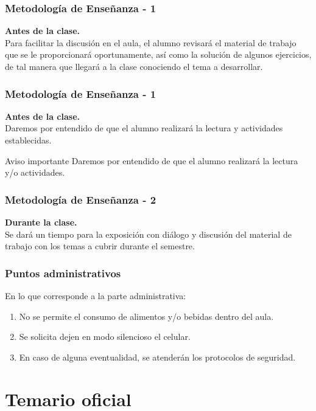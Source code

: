 \documentclass[12pt]{beamer}
\begin{document}
\begin{frame}
\frametitle{Metodología de Enseñanza - 1}
\textbf{Antes de la clase.}
\\
\vspace{0.5em}
Para facilitar la discusión en el aula, el alumno revisará el material de trabajo que se le proporcionará oportunamente, así como la solución de algunos ejercicios, de tal manera que llegará a la clase conociendo el tema a desarrollar.
\end{frame}
\begin{frame}
\frametitle{Metodología de Enseñanza - 1}
\textbf{Antes de la clase.}
\\
\vspace{0.5em}
Daremos por entendido de que el alumno realizará la lectura y actividades establecidas.
\\
\bigskip
\pause
\begin{alertblock}{Aviso importante}
Daremos por entendido de que el alumno realizará la lectura y/o actividades.
\end{alertblock}
\end{frame}
\begin{frame} 
\frametitle{Metodología de Enseñanza - 2}
\textbf{Durante la clase.}
\\
\vspace{0.5em}
Se dará un tiempo para la exposición con diálogo y discusión del material de trabajo con los temas a cubrir durante el semestre.
\end{frame}
\begin{frame}
\frametitle{Puntos administrativos}
En lo que corresponde a la parte administrativa:
\begin{enumerate}[<+->]
\item No se permite el consumo de alimentos y/o bebidas dentro del aula.
\item Se solicita dejen en modo silencioso el celular.
\item En caso de alguna eventualidad, se atenderán los protocolos de seguridad.
\end{enumerate}
\end{frame}

\section{Temario oficial}
\end{document}

